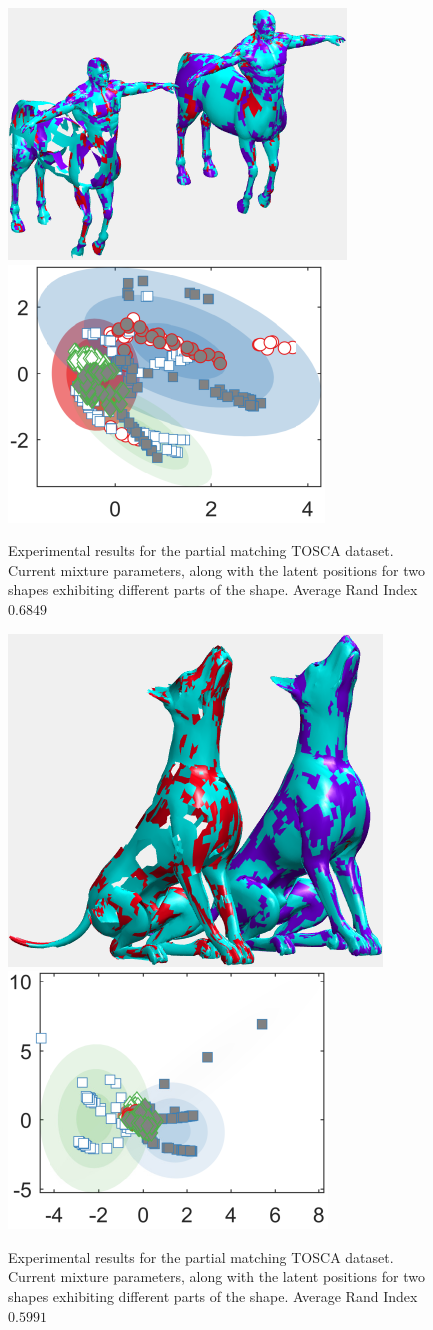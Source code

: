 \documentclass[]{article}
\begin{document}
\begin{figure}[ht!]
	\centering
	
	\includegraphics[width=0.5\linewidth]{img/holesCentaur1MVMMexp1}
	\includegraphics[width=0.35\linewidth]{img/holesCentaur1MVMMexp3}
	\caption{Experimental results for the partial matching TOSCA dataset.  Current mixture parameters, along with the latent positions for two shapes exhibiting different parts of the shape. Average Rand Index $0.6849$ }
\end{figure}

\begin{figure}[ht!]
	\centering
	
	\includegraphics[width=0.45\linewidth]{img/holesDog1MVMMexp1}
	\includegraphics[width=0.35\linewidth]{img/holesDog1MVMMexp3}
	\caption{Experimental results for the partial matching TOSCA dataset.  Current mixture parameters, along with the latent positions for two shapes exhibiting different parts of the shape. Average Rand Index $0.5991$ }
\end{figure}
\end{document}
